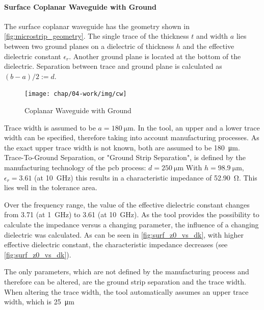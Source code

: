 \paragraph{Surface Coplanar Waveguide with Ground}
The surface coplanar waveguide has the geometry shown in \autoref{fig:microstrip_geometry}. The single trace of the thickness $t$ and width $a$ lies between two ground planes on a dielectric of thickness $h$ and the effective dielectric constant $\epsilon_r$. Another ground plane is located at the bottom of the dielectric. Separation between trace and ground plane is calculated as $(b-a)/2 := d$. 

\begin{figure}[!htbp]
	\centering
	\texttt{[image: chap/04-work/img/cw]}
	\caption{Coplanar Waveguide with Ground}
	\label{fig:microstrip_geometry}
\end{figure}

Trace width is assumed to be $a = \SI{180}{\micro \meter}$. In the tool, an upper and a lower trace width can be specified, therefore taking into account manufacturing processes. As the exact upper trace width is not known, both are assumed to be  \SI{180}{\micro \meter}.   Trace-To-Ground Separation, or "Ground Strip Separation", is defined by the manufacturing technology of the \gls{pcb} process: $d = \SI{250}{\micro \meter}$ With $h = \SI{98.9}{\micro \meter}$, $\epsilon_r = 3.61$ (at \SI{10}{\giga \hertz}) this results in a characteristic impedance of \SI{52.90}{\ohm}. This lies well in the tolerance area.

Over the frequency range, the value of the effective dielectric constant changes from 3.71 (at \SI{1}{\giga \hertz}) to 3.61 (at \SI{10}{\giga \hertz}). As the tool provides the possibility to calculate the impedance versus a changing parameter, the influence of a changing dielectric was calculated. As can be seen in \autoref{fig:surf_z0_vs_dk}, with higher effective dielectric constant, the characteristic impedance decreases (see \autoref{fig:surf_z0_vs_dk}).

The only parameters, which are not defined by the manufacturing process and therefore can be altered, are the ground strip separation and the trace width. When altering the trace width, the tool automatically assumes an upper trace width, which is \SI{25}{\micro \meter}


